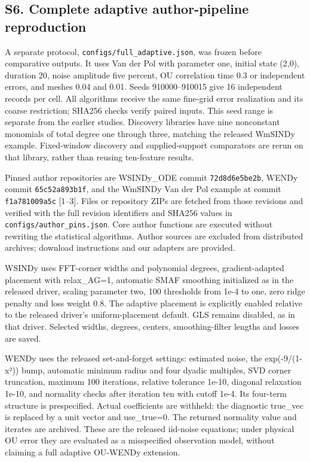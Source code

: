 \documentclass[
  american,
  11pt,
]{article}
\begin{document}
\subsection{S6. Complete adaptive author-pipeline
reproduction}\label{s6.-complete-adaptive-author-pipeline-reproduction}

A separate protocol, \texttt{configs/full\_adaptive.json}, was frozen
before comparative outputs. It uses Van der Pol with parameter one,
initial state (2,0), duration 20, noise amplitude five percent, OU
correlation time 0.3 or independent errors, and meshes 0.04 and 0.01.
Seeds 910000--910015 give 16 independent records per cell. All
algorithms receive the same fine-grid error realization and its coarse
restriction; SHA256 checks verify paired inputs. This seed range is
separate from the earlier studies. Discovery libraries have nine
nonconstant monomials of total degree one through three, matching the
released WmSINDy example. Fixed-window discovery and supplied-support
comparators are rerun on that library, rather than reusing ten-feature
results.

Pinned author repositories are WSINDy\_ODE commit \texttt{72d8d6e5be2b},
WENDy commit \texttt{65c52a893b1f}, and the WmSINDy Van der Pol example
at commit \texttt{f1a781009a5c} {[}1--3{]}. Files or repository ZIPs are
fetched from those revisions and verified with the full revision
identifiers and SHA256 values in \texttt{configs/author\_pins.json}.
Core author functions are executed without rewriting the statistical
algorithms. Author sources are excluded from distributed archives;
download instructions and our adapters are provided.

WSINDy uses FFT-corner widths and polynomial degrees, gradient-adapted
placement with relax\_AG=1, automatic SMAF smoothing initialized as in
the released driver, scaling parameter two, 100 thresholds from 1e-4 to
one, zero ridge penalty and loss weight 0.8. The adaptive placement is
explicitly enabled relative to the released driver's uniform-placement
default. GLS remains disabled, as in that driver. Selected widths,
degrees, centers, smoothing-filter lengths and losses are saved.

WENDy uses the released set-and-forget settings: estimated noise, the
exp(-9/(1-x²)) bump, automatic minimum radius and four dyadic multiples,
SVD corner truncation, maximum 100 iterations, relative tolerance 1e-10,
diagonal relaxation 1e-10, and normality checks after iteration ten with
cutoff 1e-4. Its four-term structure is prespecified. Actual
coefficients are withheld: the diagnostic true\_vec is replaced by a
unit vector and use\_true=0. The returned normality value and iterates
are archived. These are the released iid-noise equations; under physical
OU error they are evaluated as a misspecified observation model, without
claiming a full adaptive OU-WENDy extension.
\end{document}
